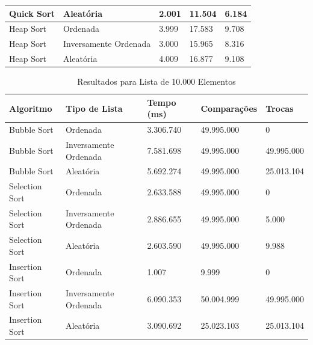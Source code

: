 \documentclass[tcc2]{uftex}
\begin{document}
\begin{table}[h]
\begin{tabular}{|l|l|l|l|l|}
Quick Sort           & Aleatória                    & 2.001               & 11.504               & 6.184          \\ \hline
Heap Sort            & Ordenada                     & 3.999               & 17.583               & 9.708          \\ \hline
Heap Sort            & Inversamente Ordenada        & 3.000               & 15.965               & 8.316          \\ \hline
Heap Sort            & Aleatória                    & 4.009               & 16.877               & 9.108          \\ \hline
\end{tabular}
\end{table}



\begin{table}[h]
\centering
\caption{Resultados para Lista de 10.000 Elementos}
\begin{tabular}{|l|l|l|l|l|}
\hline
\textbf{Algoritmo}   & \textbf{Tipo de Lista}       & \textbf{Tempo (ms)} & \textbf{Comparações} & \textbf{Trocas} \\ \hline
Bubble Sort          & Ordenada                     & 3.306.740           & 49.995.000           & 0              \\ \hline
Bubble Sort          & Inversamente Ordenada        & 7.581.698           & 49.995.000           & 49.995.000     \\ \hline
Bubble Sort          & Aleatória                    & 5.692.274           & 49.995.000           & 25.013.104     \\ \hline
Selection Sort       & Ordenada                     & 2.633.588           & 49.995.000           & 0              \\ \hline
Selection Sort       & Inversamente Ordenada        & 2.886.655           & 49.995.000           & 5.000          \\ \hline
Selection Sort       & Aleatória                    & 2.603.590           & 49.995.000           & 9.988          \\ \hline
Insertion Sort       & Ordenada                     & 1.007               & 9.999                & 0              \\ \hline
Insertion Sort       & Inversamente Ordenada        & 6.090.353           & 50.004.999           & 49.995.000     \\ \hline
Insertion Sort       & Aleatória                    & 3.090.692           & 25.023.103           & 25.013.104     \\ \hline

\end{tabular}
\end{table}
\end{document}
